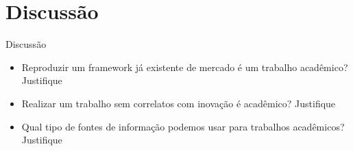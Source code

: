 \section{Discussão}

\begin{frame}
	\begin{block}{Discussão}
		\begin{itemize}
			\item Reproduzir um framework já existente de mercado é um trabalho acadêmico? Justifique
			\item Realizar um trabalho sem correlatos com inovação é acadêmico? Justifique
			\item Qual tipo de fontes de informação podemos usar para trabalhos acadêmicos?  Justifique
		\end{itemize}
	\end{block}
\end{frame}
